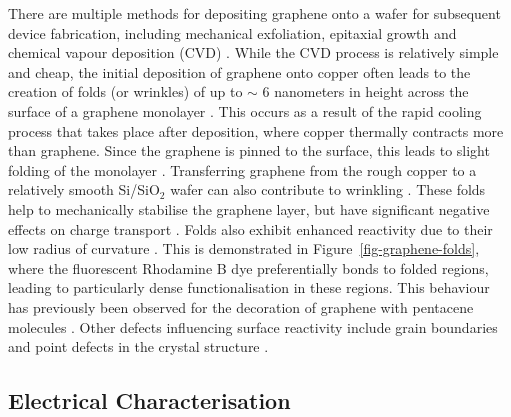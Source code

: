 \documentclass[
  a4paper,
]{scrbook}
\begin{document}
There are multiple methods for depositing graphene onto a wafer for
subsequent device fabrication, including mechanical exfoliation,
epitaxial growth and chemical vapour deposition (CVD)
\autocite{Reddy2011}. While the CVD process is relatively simple and
cheap, the initial deposition of graphene onto copper often leads to the
creation of folds (or wrinkles) of up to \(\sim\) 6 nanometers in height
across the surface of a graphene monolayer \autocite{Zhu2012}. This
occurs as a result of the rapid cooling process that takes place after
deposition, where copper thermally contracts more than graphene. Since
the graphene is pinned to the surface, this leads to slight folding of
the monolayer \autocite{Zhao2012,Zhu2012,Chhikara2013}. Transferring
graphene from the rough copper to a relatively smooth Si/SiO\(_2\) wafer
can also contribute to wrinkling \autocite{Zhao2012,Kireev2017}. These
folds help to mechanically stabilise the graphene layer, but have
significant negative effects on charge transport
\autocite{Geim2007,Chhikara2013,Zhu2012}. Folds also exhibit enhanced
reactivity due to their low radius of curvature \autocite{Zhao2012}.
This is demonstrated in Figure~\ref{fig-graphene-folds}, where the
fluorescent Rhodamine B dye preferentially bonds to folded regions,
leading to particularly dense functionalisation in these regions. This
behaviour has previously been observed for the decoration of graphene
with pentacene molecules \autocite{Chhikara2013}. Other defects
influencing surface reactivity include grain boundaries and point
defects in the crystal structure
\autocite{Zhao2012,Chhikara2013,Kireev2017}.

\hypertarget{sec-electrical-characterisation-graphene}{%
\subsection{Electrical
Characterisation}\label{sec-electrical-characterisation-graphene}}
\end{document}
